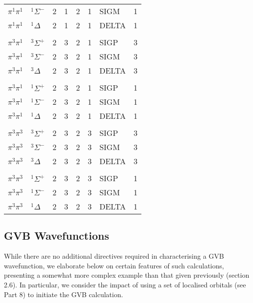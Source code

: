 \documentclass[11pt,fleqn]{article}
\begin{document}
\begin{table}
\begin{centering}
\begin{tabular}{lllllllr}
 $\pi^{1}\pi^{1}$   & $^{1}\Sigma^{-}$   &  2 & 1 & 2 & 1 & SIGM  &  1 \\
 $\pi^{1}\pi^{1}$   & $^{1}\Delta$   &  2 & 1 & 2 & 1 & DELTA  &  1 \\
\\
 $\pi^{3}\pi^{1}$   & $^{3}\Sigma^{+}$   &  2 & 3 & 2 & 1 & SIGP  &  3 \\
 $\pi^{3}\pi^{1}$   & $^{3}\Sigma^{-}$   &  2 & 3 & 2 & 1 & SIGM  &  3 \\
 $\pi^{3}\pi^{1}$   & $^{3}\Delta$   &  2 & 3 & 2 & 1 & DELTA  &  3 \\
\\
 $\pi^{3}\pi^{1}$   & $^{1}\Sigma^{+}$   &  2 & 3 & 2 & 1 & SIGP  &  1 \\
 $\pi^{3}\pi^{1}$   & $^{1}\Sigma^{-}$   &  2 & 3 & 2 & 1 & SIGM  &  1 \\
 $\pi^{3}\pi^{1}$   & $^{1}\Delta$   &  2 & 3 & 2 & 1 & DELTA  &  1 \\
\\
 $\pi^{3}\pi^{3}$   & $^{3}\Sigma^{+}$   &  2 & 3 & 2 & 3 & SIGP  &  3 \\
 $\pi^{3}\pi^{3}$   & $^{3}\Sigma^{-}$   &  2 & 3 & 2 & 3 & SIGM  &  3 \\
 $\pi^{3}\pi^{3}$   & $^{3}\Delta$   &  2 & 3 & 2 & 3 & DELTA  &  3 \\
\\
 $\pi^{3}\pi^{3}$   & $^{1}\Sigma^{+}$   &  2 & 3 & 2 & 3 & SIGP  &  1 \\
 $\pi^{3}\pi^{3}$   & $^{1}\Sigma^{-}$   &  2 & 3 & 2 & 3 & SIGM  &  1 \\
 $\pi^{3}\pi^{3}$   & $^{1}\Delta$   &  2 & 3 & 2 & 3 & DELTA  &  1 \\ \hline\hline
\end{tabular}
 
\end{centering}
 
\end{table}
 
\clearpage

\subsection[GVB Wavefunctions]{GVB Wavefunctions}

While there are no additional directives required in characterising
a GVB wavefunction, we elaborate below on certain features
of such calculations, presenting a somewhat more complex example
than that given previously (section 2.6).
In particular, we consider the impact of using a set of localised
orbitals (see Part 8) to initiate the GVB calculation.
\end{document}

